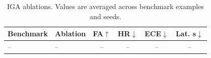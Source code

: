 \begin{table}[t]
\centering
\caption{IGA ablations. Values are averaged across benchmark examples and seeds.}
\label{tab:ablations}
\small
\begin{tabular}{llcccc}
\toprule
Benchmark & Ablation & FA$\uparrow$ & HR$\downarrow$ & ECE$\downarrow$ & Lat. s$\downarrow$ \\
\midrule
-- & -- & -- & -- & -- & -- \\
\bottomrule
\end{tabular}
\end{table}
